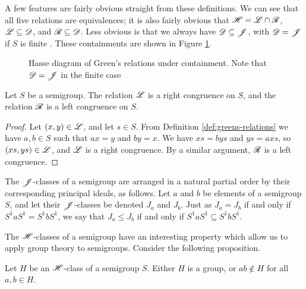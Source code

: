 A few features are fairly obvious straight from these definitions.  We can see
that all five relations are equivalences; it is also fairly obvious that
$\mathscr{H} = \mathscr{L} \cap \mathscr{R}$, $\mathscr{L} \subseteq \mathscr{D}$, and $\mathscr{R} \subseteq \mathscr{D}$.  Less
obvious is that we always have $\mathscr{D} \subseteq \mathscr{J}$, with $\mathscr{D} = \mathscr{J}$ if $S$ is
finite \cite[\S2.1]{howie}.  These containments are shown in Figure
\ref{fig:greens-containment}.

\begin{figure}[ht]
  \centering
  \caption[Hasse diagram of Green's relations under containment]{Hasse diagram
    of Green's relations under containment.  Note that $\mathscr{D} = \mathscr{J}$ in the finite
    case}
  \label{fig:greens-containment}
\end{figure}

\begin{proposition}
  \label{prop:greens-as-congs}
  Let $S$ be a semigroup.  The relation $\mathrel{\mathscr{L}}$ is a right congruence on $S$, and
  the relation $\mathrel{\mathscr{R}}$ is a left congruence on $S$.
  \begin{proof}
    Let $(x,y) \in \mathscr{L}$, and let $s \in S$.  From Definition
    \ref{def:greens-relations} we have $a,b \in S$ such that $ax=y$ and $by=x$.
    We have $xs = bys$ and $ys = axs$, so $(xs,ys) \in \mathscr{L}$, and $\mathrel{\mathscr{L}}$ is a
    right congruence.  By a similar argument, $\mathrel{\mathscr{R}}$ is a left congruence.
  \end{proof}
\end{proposition}

The $\mathrel{\mathscr{J}}$-classes of a semigroup are arranged in a natural partial order by
their corresponding principal ideals, as follows.  Let $a$ and $b$ be elements
of a semigroup $S$, and let their $\mathrel{\mathscr{J}}$-classes be denoted $J_a$ and $J_b$.
Just as $J_a = J_b$ if and only if $S^1aS^1 = S^1bS^1$, we say that
$J_a \leq J_b$ if and only if $S^1aS^1 \subseteq S^1bS^1$.

The $\mathrel{\mathscr{H}}$-classes of a semigroup have an interesting property which allow us to
apply group theory to semigroups.  Consider the following proposition.

\begin{proposition}
  \label{prop:group-h-class}
  Let $H$ be an $\mathrel{\mathscr{H}}$-class of a semigroup $S$.  Either $H$ is a group, or
  $ab \notin H$ for all $a,b \in H$.
\end{proposition}

